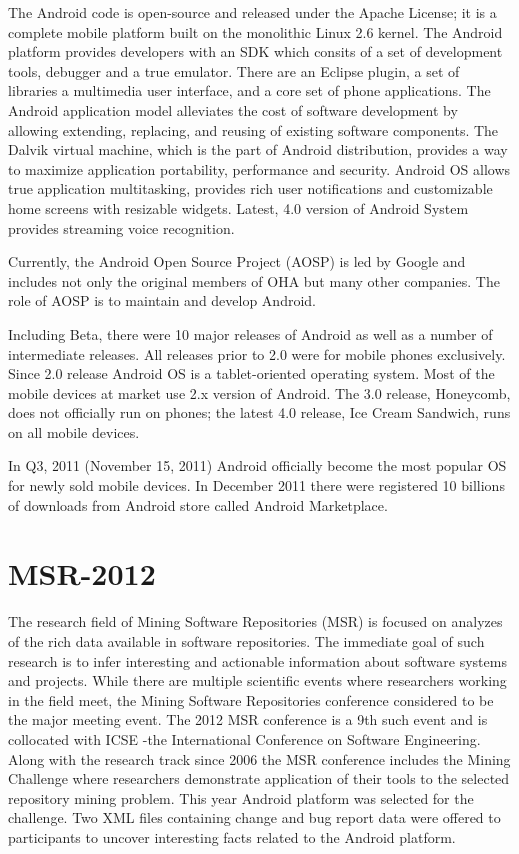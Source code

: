 \documentclass[a4paper,10pt]{report}
\numberwithin{equation}{subsection}
\begin{document}
The Android code is open-source and released under the Apache License; it is a complete 
mobile platform built on the monolithic Linux 2.6 kernel. The Android platform provides 
developers with an SDK which consits of a set of development tools, debugger and a true emulator. 
There are an Eclipse plugin, a set of libraries a multimedia user interface, and a core set of 
phone applications. The Android application model alleviates the cost of software development by 
allowing extending, replacing, and reusing of existing software components. The Dalvik virtual 
machine, which is the part of Android distribution, provides a way to maximize application portability, 
performance and security. Android OS allows true application multitasking, provides rich user 
notifications and customizable home screens with resizable widgets. Latest, 4.0 version of
Android System provides streaming voice recognition.

Currently, the Android Open Source Project (AOSP) is led by Google and includes not only the 
original members of OHA but many other companies. The role of AOSP is to maintain and develop 
Android.

Including Beta, there were 10 major releases of Android as well as a number of intermediate 
releases. All releases prior to 2.0 were for mobile phones exclusively. Since 2.0 release 
Android OS is a tablet-oriented operating system. Most of the mobile devices at market use 
2.x version of Android. The 3.0 release, Honeycomb, does not officially run on phones; 
the latest 4.0 release, Ice Cream Sandwich, runs on all mobile devices.

In Q3, 2011 (November 15, 2011) Android officially become the most popular OS for newly sold mobile 
devices. In December 2011 there were registered 10 billions of downloads from Android store called
Android Marketplace. 

\section{MSR-2012}
The research field of Mining Software Repositories (MSR) is focused on analyzes of the rich 
data available in software repositories. The immediate goal of such research is to infer interesting 
and actionable information about software systems and projects. While there are multiple scientific 
events where researchers working in the field meet, the Mining Software Repositories 
conference considered to be the major meeting event. The 2012 MSR conference is a 9th such event
and is collocated with ICSE -the International Conference on Software Engineering.
Along with the research track since 2006 the MSR conference includes the Mining Challenge where 
researchers demonstrate application of their tools to the selected repository mining problem. This
year Android platform was selected for the challenge. Two XML files containing change and bug report 
data were offered to participants to uncover interesting facts related to the Android platform.
\end{document}

